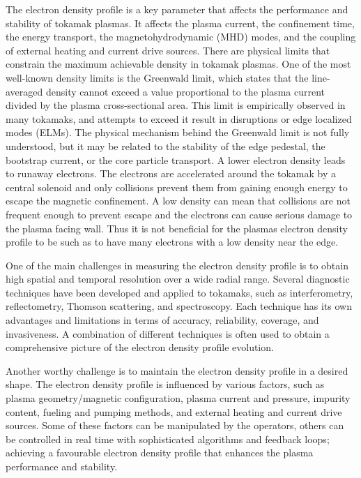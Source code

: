 The electron density profile is a key parameter that affects the performance and stability of tokamak plasmas. It affects the plasma current, the confinement time, the energy transport, the magnetohydrodynamic (MHD) modes, and the coupling of external heating and current drive sources. There are physical limits that constrain the maximum achievable density in tokamak plasmas. One of the most well-known density limits is the Greenwald limit, which states that the line-averaged density cannot exceed a value proportional to the plasma current divided by the plasma cross-sectional area. This limit is empirically observed in many tokamaks, and attempts to exceed it result in disruptions or edge localized modes (ELMs). The physical mechanism behind the Greenwald limit is not fully understood, but it may be related to the stability of the edge pedestal, the bootstrap current, or the core particle transport. A lower electron density leads to runaway electrons. The electrons are accelerated around the tokamak by a central solenoid and only collisions prevent them from gaining enough energy to escape the magnetic confinement. A low density can mean that collisions are not frequent enough to prevent escape and the electrons can cause serious damage to the plasma facing wall. Thus it is not beneficial for the plasmas electron density profile to be such as to have many electrons with a low density near the edge. 

One of the main challenges in measuring the electron density profile is to obtain high spatial and temporal resolution over a wide radial range. Several diagnostic techniques have been developed and applied to tokamaks, such as interferometry, reflectometry, Thomson scattering, and spectroscopy. Each technique has its own advantages and limitations in terms of accuracy, reliability, coverage, and invasiveness. A combination of different techniques is often used to obtain a comprehensive picture of the electron density profile evolution.

Another worthy challenge is to maintain the electron density profile in a desired shape. The electron density profile is influenced by various factors, such as plasma geometry/magnetic configuration, plasma current and pressure, impurity content, fueling and pumping methods, and external heating and current drive sources. Some of these factors can be manipulated by the operators, others can be controlled in real time with sophisticated algorithms and feedback loops; achieving a favourable electron density profile that enhances the plasma performance and stability.

